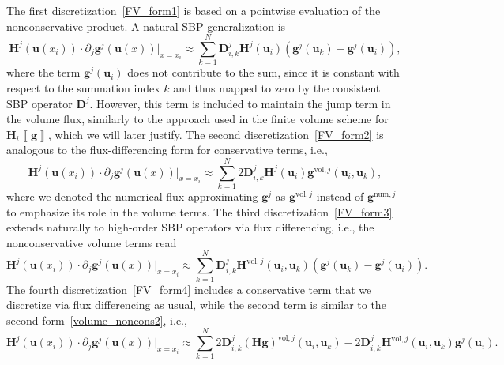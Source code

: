 \documentclass[]{scrartcl}
\newcommand{\mtx}[1]{\boldsymbol{#1}}
\renewcommand{\vec}[1]{\boldsymbol{#1}}
\newcommand{\jump}[1]{\left\llbracket #1  \right\rrbracket}
\theoremstyle{definition}
\begin{document}
The first discretization~\eqref{FV_form1} is based on a pointwise evaluation of the nonconservative product.
A natural SBP generalization is
\begin{equation}
    \vec{H}^j(\vec{u}(x_i)) \cdot \partial_j \vec{g}^j(\vec{u}(x)) \Big |_{x = x_i}
    \approx
    \sum_{k = 1}^N \mtx{D}^j_{i,k} \vec{H}^j(\vec{u}_i) \left (\vec{g}^j(\vec{u}_k) - \vec{g}^j(\vec{u}_i) \right ),
    \label{volume_noncons1}
\end{equation}
where the term $\vec{g}^j(\vec{u}_i)$ does not contribute to the sum, since it is constant with respect to the summation index $k$ and thus mapped to zero by the consistent SBP operator $\mtx{D}^j$. However, this term is included to maintain the jump term in the volume flux, similarly to the approach used in the finite volume scheme for $\vec{H}_i\jump{\vec{g}}$, which we will later justify.
The second discretization~\eqref{FV_form2} is analogous to the flux-differencing form for conservative terms, i.e.,
\begin{equation}
    \vec{H}^j(\vec{u}(x_i)) \cdot \partial_j \vec{g}^j(\vec{u}(x)) \Big |_{x = x_i}
    \approx
    \sum_{k = 1}^N 2 \mtx{D}^j_{i,k} \vec{H}^j(\vec{u}_i) \vec{g}^{\mathrm{vol},j}(\vec{u}_i, \vec{u}_k),
    \label{volume_noncons2}
\end{equation}
where we denoted the numerical flux approximating $\vec{g}^j$ as $\vec{g}^{\mathrm{vol},j}$ instead of $\vec{g}^{\mathrm{num},j}$ to emphasize its role in the volume terms.
The third discretization~\eqref{FV_form3} extends naturally to high-order SBP operators via flux differencing, i.e., the nonconservative volume terms read~\cite{RUEDARAMIREZ2024112607, artiano2025structurepreservinghighordermethodscompressible}
\begin{equation}
    \vec{H}^j(\vec{u}(x_i)) \cdot \partial_j \vec{g}^j(\vec{u}(x)) \Big |_{x = x_i}
    \approx
    \sum_{k = 1}^N \mtx{D}^j_{i,k} \vec{H}^{\mathrm{vol},j}\left (\vec{u}_i, \vec{u}_k \right ) \left (\vec{g}^{j}(\vec{u}_k) - \vec{g}^{j}(\vec{u}_i) \right ).
\label{volume_noncons3}
\end{equation}
The fourth discretization~\eqref{FV_form4} includes a conservative term that we discretize via flux differencing as usual, while the second term is similar to the second form~\eqref{volume_noncons2}, i.e.,
\begin{equation}
    \vec{H}^j(\vec{u}(x_i)) \cdot \partial_j \vec{g}^j(\vec{u}(x)) \big |_{x = x_i}
    \approx
    \sum_{k = 1}^N 2 \mtx{D}^j_{i,k} \left ( \vec{H}\vec{g}\right )^{\mathrm{vol},j}(\vec{u}_i, \vec{u}_k) - 2 \mtx{D}^j_{i,k} \vec{H}^{\mathrm{vol},j}(\vec{u}_i,\vec{u}_k) \vec{g}^j(\vec{u}_i).
\label{volume_noncons4}
\end{equation}
\end{document}
